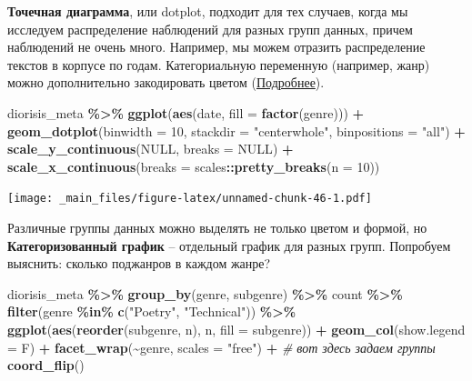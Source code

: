 \documentclass[
]{book}
\newenvironment{Shaded}{\begin{snugshade}}{\end{snugshade}}
\newcommand{\AttributeTok}[1]{\textcolor[rgb]{0.13,0.29,0.53}{#1}}
\newcommand{\CommentTok}[1]{\textcolor[rgb]{0.56,0.35,0.01}{\textit{#1}}}
\newcommand{\ConstantTok}[1]{\textcolor[rgb]{0.56,0.35,0.01}{#1}}
\newcommand{\DecValTok}[1]{\textcolor[rgb]{0.00,0.00,0.81}{#1}}
\newcommand{\FunctionTok}[1]{\textcolor[rgb]{0.13,0.29,0.53}{\textbf{#1}}}
\newcommand{\NormalTok}[1]{#1}
\newcommand{\SpecialCharTok}[1]{\textcolor[rgb]{0.81,0.36,0.00}{\textbf{#1}}}
\newcommand{\StringTok}[1]{\textcolor[rgb]{0.31,0.60,0.02}{#1}}
\theoremstyle{definition}
\theoremstyle{definition}
\theoremstyle{definition}
\theoremstyle{definition}
\theoremstyle{remark}
\begin{document}
\textbf{Точечная диаграмма}, или dotplot, подходит для тех случаев, когда мы исследуем распределение наблюдений для разных групп данных, причем наблюдений не очень много. Например, мы можем отразить распределение текстов в корпусе по годам. Категориальную переменную (например, жанр) можно дополнительно закодировать цветом (\href{https://t.me/antibarbari/109}{Подробнее}).

\begin{Shaded}
\begin{Highlighting}[]
\NormalTok{diorisis\_meta }\SpecialCharTok{\%\textgreater{}\%} \FunctionTok{ggplot}\NormalTok{(}\FunctionTok{aes}\NormalTok{(date, }\AttributeTok{fill =} \FunctionTok{factor}\NormalTok{(genre))) }\SpecialCharTok{+} 
  \FunctionTok{geom\_dotplot}\NormalTok{(}\AttributeTok{binwidth =} \DecValTok{10}\NormalTok{, }\AttributeTok{stackdir =} \StringTok{"centerwhole"}\NormalTok{, }\AttributeTok{binpositions =} \StringTok{"all"}\NormalTok{) }\SpecialCharTok{+}  
  \FunctionTok{scale\_y\_continuous}\NormalTok{(}\ConstantTok{NULL}\NormalTok{, }\AttributeTok{breaks =} \ConstantTok{NULL}\NormalTok{) }\SpecialCharTok{+} 
  \FunctionTok{scale\_x\_continuous}\NormalTok{(}\AttributeTok{breaks =}\NormalTok{ scales}\SpecialCharTok{::}\FunctionTok{pretty\_breaks}\NormalTok{(}\AttributeTok{n =} \DecValTok{10}\NormalTok{))}
\end{Highlighting}
\end{Shaded}

\texttt{[image: \_main\_files/figure-latex/unnamed-chunk-46-1.pdf]}

Различные группы данных можно выделять не только цветом и формой, но \textbf{Категоризованный график} -- отдельный график для разных групп. Попробуем выяснить: сколько поджанров в каждом жанре?

\begin{Shaded}
\begin{Highlighting}[]
\NormalTok{diorisis\_meta }\SpecialCharTok{\%\textgreater{}\%} 
  \FunctionTok{group\_by}\NormalTok{(genre, subgenre) }\SpecialCharTok{\%\textgreater{}\%} 
\NormalTok{  count }\SpecialCharTok{\%\textgreater{}\%}
  \FunctionTok{filter}\NormalTok{(genre }\SpecialCharTok{\%in\%} \FunctionTok{c}\NormalTok{(}\StringTok{"Poetry"}\NormalTok{, }\StringTok{"Technical"}\NormalTok{)) }\SpecialCharTok{\%\textgreater{}\%} 
  \FunctionTok{ggplot}\NormalTok{(}\FunctionTok{aes}\NormalTok{(}\FunctionTok{reorder}\NormalTok{(subgenre, n), n, }\AttributeTok{fill =}\NormalTok{ subgenre)) }\SpecialCharTok{+} 
  \FunctionTok{geom\_col}\NormalTok{(}\AttributeTok{show.legend =}\NormalTok{ F) }\SpecialCharTok{+}
  \FunctionTok{facet\_wrap}\NormalTok{(}\SpecialCharTok{\textasciitilde{}}\NormalTok{genre, }\AttributeTok{scales =} \StringTok{"free"}\NormalTok{) }\SpecialCharTok{+} \CommentTok{\# вот здесь задаем  группы}
  \FunctionTok{coord\_flip}\NormalTok{()}
\end{Highlighting}
\end{Shaded}
\end{document}
